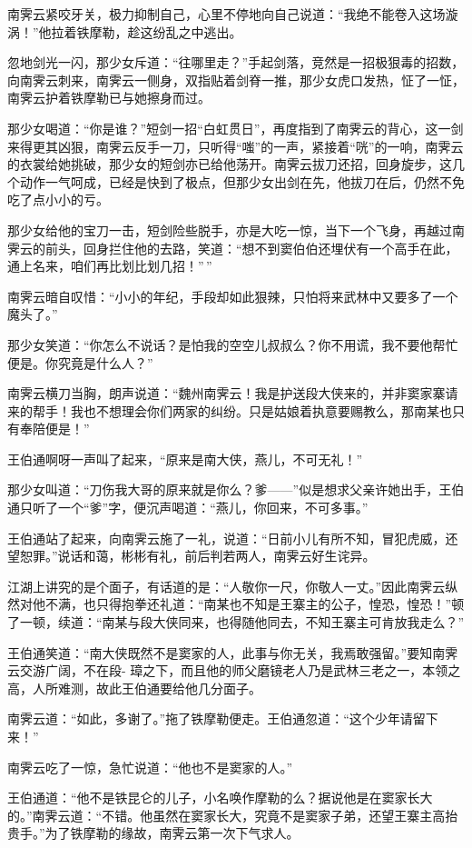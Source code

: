 \documentclass[12pt,oneside]{book}
\begin{document}
南霁云紧咬牙关，极力抑制自己，心里不停地向自己说道：``我绝不能卷入这场漩涡！''他拉着铁摩勒，趁这纷乱之中逃出。

忽地剑光一闪，那少女斥道：``往哪里走？''手起剑落，竞然是一招极狠毒的招数，向南霁云刺来，南霁云一侧身，双指贴着剑脊一推，那少女虎口发热，怔了一怔，南霁云护着铁摩勒已与她擦身而过。

那少女喝道：``你是谁？''短剑一招``白虹贯日''，再度指到了南霁云的背心，这一剑来得更其凶狠，南霁云反手一刀，只听得``嗤''的一声，紧接着``咣''的一响，南霁云的衣裳给她挑破，那少女的短剑亦已给他荡开。南霁云拔刀还招，回身旋步，这几个动作一气呵成，已经是快到了极点，但那少女出剑在先，他拔刀在后，仍然不免吃了点小小的亏。

那少女给他的宝刀一击，短剑险些脱手，亦是大吃一惊，当下一个飞身，再越过南霁云的前头，回身拦住他的去路，笑道：``想不到窦伯伯还埋伏有一个高手在此，通上名来，咱们再比划比划几招！''\,''

南霁云暗自叹惜：``小小的年纪，手段却如此狠辣，只怕将来武林中又要多了一个魔头了。''

那少女笑道：``你怎么不说话？是怕我的空空儿叔叔么？你不用谎，我不要他帮忙便是。你究竟是什么人？''

南霁云横刀当胸，朗声说道：``魏州南霁云！我是护送段大侠来的，并非窦家寨请来的帮手！我也不想理会你们两家的纠纷。只是姑娘着执意要赐教么，那南某也只有奉陪便是！''

王伯通啊呀一声叫了起来，``原来是南大侠，燕儿，不可无礼！''

那少女叫道：``刀伤我大哥的原来就是你么？爹------''似是想求父亲许她出手，王伯通只听了一个``爹''字，便沉声喝道：``燕儿，你回来，不可多事。''

王伯通站了起来，向南霁云施了一礼，说道：``日前小儿有所不知，冒犯虎威，还望恕罪。''说话和蔼，彬彬有礼，前后判若两人，南霁云好生诧异。

江湖上讲究的是个面子，有话道的是：``人敬你一尺，你敬人一丈。''因此南霁云纵然对他不满，也只得抱拳还礼道：``南某也不知是王寨主的公子，惶恐，惶恐！''顿了一顿，续道：``南某与段大侠同来，也得随他同去，不知王寨主可肯放我走么？''

王伯通笑道：``南大侠既然不是窦家的人，此事与你无关，我焉敢强留。''要知南霁云交游广阔，不在段-
璋之下，而且他的师父磨镜老人乃是武林三老之一，本领之高，人所难测，故此王伯通要给他几分面子。

南霁云道：``如此，多谢了。''拖了铁摩勒便走。王伯通忽道：``这个少年请留下来！''

南霁云吃了一惊，急忙说道：``他也不是窦家的人。''

王伯通道：``他不是铁昆仑的儿子，小名唤作摩勒的么？据说他是在窦家长大的。''南霁云道：``不错。他虽然在窦家长大，究竟不是窦家子弟，还望王寨主高抬贵手。''为了铁摩勒的缘故，南霁云第一次下气求人。
\end{document}
